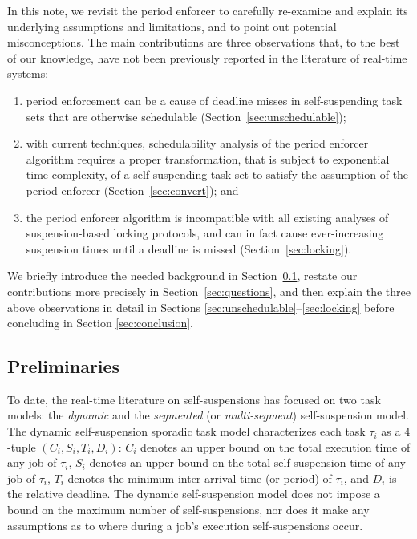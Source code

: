 In this note, we revisit the period enforcer \cite{Raj:suspension1991} to carefully re-examine and explain its underlying assumptions and limitations, and to point out potential misconceptions.  The main contributions are three observations that, to the best of our knowledge, have not been previously reported in the literature of real-time systems:
\begin{enumerate}
	\item period enforcement can be a cause of deadline misses in self-suspending task sets that are otherwise schedulable (Section~\ref{sec:unschedulable}); 
	\item with current techniques, schedulability analysis of the period enforcer algorithm requires a proper transformation, that is subject to exponential time complexity, of a self-suspending task set to satisfy the assumption of the period enforcer (Section~\ref{sec:convert}); and
	\item the period enforcer algorithm is incompatible with all existing analyses of suspension-based locking protocols, and can in fact cause ever-increasing suspension times until a deadline is missed (Section~\ref{sec:locking}).
\end{enumerate}


We briefly introduce the needed background in Section~\ref{sec:prelim}, restate our contributions more precisely in Section~\ref{sec:questions}, and then explain the three above  observations in detail in Sections \ref{sec:unschedulable}--\ref{sec:locking} before concluding in Section \ref{sec:conclusion}.

\subsection{Preliminaries}
\label{sec:prelim}

To date, the real-time literature on self-suspensions has focused on two task models: the \emph{dynamic} and the \emph{segmented} (or \emph{multi-segment}) self-suspension model. 
The dynamic self-suspension sporadic task model characterizes each
task $\tau_i$ as a $4$-tuple $(C_i,S_i,T_i,D_i)$: 
$C_i$ denotes an upper bound on the total execution time of any job of $\tau_i$,
$S_i$ denotes an upper bound on the total self-suspension time of any job of $\tau_i$,
$T_i$ denotes the minimum inter-arrival time (or period) of $\tau_i$, and $D_i$ is the relative deadline. The dynamic self-suspension model does not impose a bound on the maximum number of self-suspensions, nor does it make any assumptions as to where during a job's execution self-suspensions occur.

